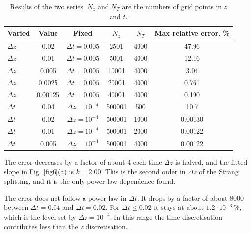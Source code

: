 \documentclass{article}
\begin{document}
                \begin{table}[H]
                    \centering
                    \begin{tabular}{l c c c c c}
                        \hline
                        Varied & Value & Fixed & \(N_z\) & \(N_T\) & Max relative error, \% \\
                        \hline
                        \(\Delta z\) & 0.02 & \(\Delta t = 0.005\) & 2501 & 4000 & 47.96 \\
                        \(\Delta z\) & 0.01 & \(\Delta t = 0.005\) & 5001 & 4000 & 12.16 \\
                        \(\Delta z\) & 0.005 & \(\Delta t = 0.005\) & 10001 & 4000 & 3.04 \\
                        \(\Delta z\) & 0.0025 & \(\Delta t = 0.005\) & 20001 & 4000 & 0.761 \\
                        \(\Delta z\) & 0.00125 & \(\Delta t = 0.005\) & 40001 & 4000 & 0.190 \\
                        \hline
                        \(\Delta t\) & 0.04 & \(\Delta z = 10^{-4}\) & 500001 & 500 & 10.7 \\
                        \(\Delta t\) & 0.02 & \(\Delta z = 10^{-4}\) & 500001 & 1000 & 0.00130 \\
                        \(\Delta t\) & 0.01 & \(\Delta z = 10^{-4}\) & 500001 & 2000 & 0.00122 \\
                        \(\Delta t\) & 0.005 & \(\Delta z = 10^{-4}\) & 500001 & 4000 & 0.00122 \\
                        \hline
                    \end{tabular}
                    \caption{
                    Results of the two series. \(N_z\) and \(N_T\) are the numbers of grid points in \(z\) and \(t\).
                    } \label{tab1}
                \end{table}

                The error decreases by a factor of about 4 each time \(\Delta z\) is halved, and the fitted slope in Fig. \ref{fig6}(a) is \(k = 2.00\). This is the second order in \(\Delta z\) of the Strang splitting, and it is the only power-law dependence found.

                The error does not follow a power law in \(\Delta t\). It drops by a factor of about 8000 between \(\Delta t = 0.04\) and \(\Delta t = 0.02\). For \(\Delta t \leq 0.02\) it stays at about \(1.2\cdot10^{-3}\,\%\), which is the level set by \(\Delta z = 10^{-4}\). In this range the time discretisation contributes less than the \(z\) discretisation.
\end{document}
